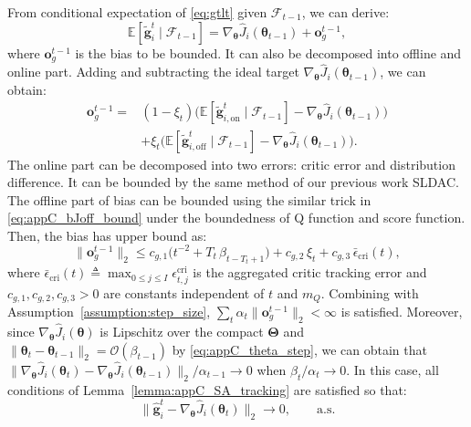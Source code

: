 \documentclass{IEEEtran}
\begin{document}
From conditional expectation of \eqref{eq:gtlt} given $\mathcal{F}_{t-1}$, we can derive: 
\begin{equation}
\mathbb{E}[\tilde{\boldsymbol{g}}_i^{t}\mid\mathcal{F}_{t-1}]
=\nabla_{\boldsymbol{\theta}}\hat{J}_i(\boldsymbol{\theta}_{t-1})+\boldsymbol{o}_g^{t-1},
\label{eq:appC_g_cond_mean}
\end{equation}
where $\boldsymbol{o}_g^{t-1}$ is the bias to be bounded. It can also be decomposed into offline and online part. Adding and subtracting the ideal target $\nabla_{\boldsymbol{\theta}}\hat{J}_i(\boldsymbol{\theta}_{t-1})$, we can obtain: 
\begin{equation}
\begin{aligned}
\boldsymbol{o}_g^{t-1}
=
&(1-\xi_t)\Big(
\mathbb{E}[\tilde{\boldsymbol{g}}_{i,\mathrm{on}}^t\mid\mathcal{F}_{t-1}]
-\nabla_{\boldsymbol{\theta}}\hat{J}_i(\boldsymbol{\theta}_{t-1})
\Big) \\
&+\xi_t\Big(
\mathbb{E}[\tilde{\boldsymbol{g}}_{i,\mathrm{off}}^t\mid\mathcal{F}_{t-1}]
-\nabla_{\boldsymbol{\theta}}\hat{J}_i(\boldsymbol{\theta}_{t-1})
\Big).
\end{aligned}
\end{equation}
The online part can be decomposed into two errors: critic error and distribution difference. It can be bounded by the same method of our previous work SLDAC. The offline part of bias can be bounded using the similar trick in \eqref{eq:appC_bJoff_bound} under the boundedness of Q function and score function. Then, the bias has upper bound as: 
\begin{equation}
\|\boldsymbol{o}_{g}^{t-1}\|_2
\le c_{g,1}\Big(t^{-2}+T_t\,\beta_{t-T_t+1}\Big)
+c_{g,2}\,\xi_t
+ c_{g,3}\,\bar{\epsilon}_{\mathrm{cri}}(t),
\label{eq:appC_og_bound}
\end{equation}
where $\bar{\epsilon}_{\mathrm{cri}}(t)\triangleq\max_{0\le j\le I}\epsilon_{t,j}^{\mathrm{cri}}$ is the aggregated critic tracking error and $c_{g,1},c_{g,2},c_{g,3}>0$ are constants independent of $t$ and $m_Q$.
Combining with Assumption~\ref{assumption:step_size}, $\sum_t \alpha_t\|\boldsymbol{o}_g^{t-1}\|_2<\infty$ is satisfied. Moreover, since $\nabla_{\boldsymbol{\theta}}\hat{J}_i(\boldsymbol{\theta})$ is Lipschitz over the compact $\boldsymbol{\Theta}$ and $\|\boldsymbol{\theta}_{t}-\boldsymbol{\theta}_{t-1}\|_2=\mathcal{O}(\beta_{t-1})$ by \eqref{eq:appC_theta_step}, we can obtain that $\|\nabla_{\boldsymbol{\theta}}\hat{J}_i(\boldsymbol{\theta}_{t})-\nabla_{\boldsymbol{\theta}}\hat{J}_i(\boldsymbol{\theta}_{t-1})\|_2/\alpha_{t-1}\to 0$ when $\beta_t/\alpha_t\to 0$. In this case, all conditions of Lemma~\ref{lemma:appC_SA_tracking} are satisfied so that: 
\begin{equation}
\big\|\hat{\boldsymbol{g}}_i^{t}-\nabla_{\boldsymbol{\theta}}\hat{J}_i(\boldsymbol{\theta}_{t})\big\|_2\to 0,
\qquad \text{a.s.}
\label{eq:appC_g_track_aux}
\end{equation}
\end{document}

